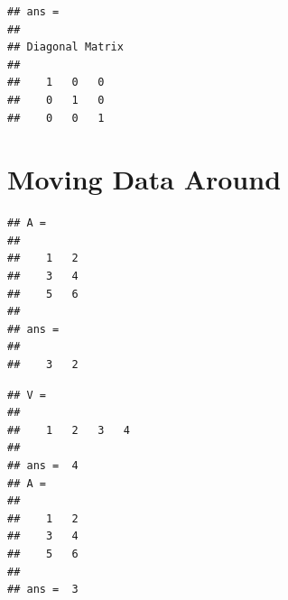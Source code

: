 \documentclass[
]{book}
\newenvironment{Shaded}{\begin{snugshade}}{\end{snugshade}}
\newcommand{\CommentTok}[1]{\textcolor[rgb]{0.56,0.35,0.01}{\textit{#1}}}
\newcommand{\FloatTok}[1]{\textcolor[rgb]{0.00,0.00,0.81}{#1}}
\newcommand{\FunctionTok}[1]{\textcolor[rgb]{0.00,0.00,0.00}{#1}}
\newcommand{\NormalTok}[1]{#1}
\newcommand{\OperatorTok}[1]{\textcolor[rgb]{0.81,0.36,0.00}{\textbf{#1}}}
\begin{document}
\begin{verbatim}
## ans =
## 
## Diagonal Matrix
## 
##    1   0   0
##    0   1   0
##    0   0   1
\end{verbatim}

\begin{Shaded}
\begin{Highlighting}[]
\CommentTok{%
\CommentTok{%
\end{Highlighting}
\end{Shaded}

\hypertarget{moving-data-around}{%
\section{Moving Data Around}\label{moving-data-around}}

\begin{Shaded}
\end{Shaded}

\begin{verbatim}
## A =
## 
##    1   2
##    3   4
##    5   6
## 
## ans =
## 
##    3   2
\end{verbatim}

\begin{Shaded}
\end{Shaded}

\begin{verbatim}
## V =
## 
##    1   2   3   4
## 
## ans =  4
## A =
## 
##    1   2
##    3   4
##    5   6
## 
## ans =  3
\end{verbatim}
\end{document}
